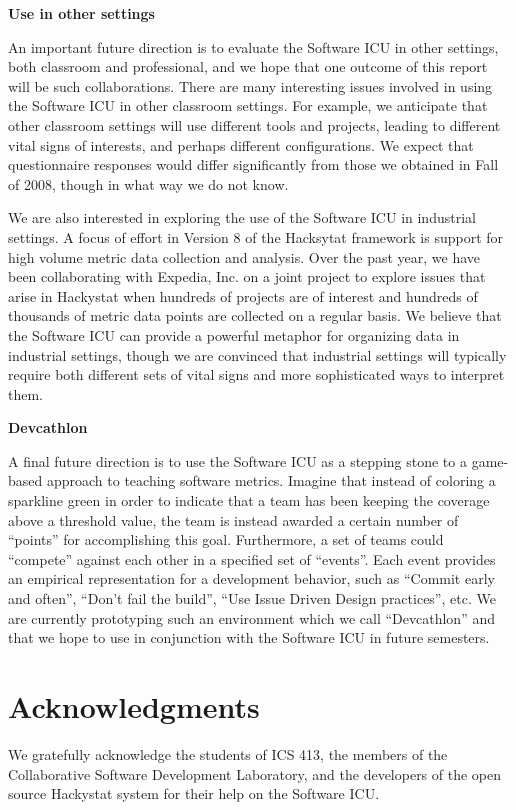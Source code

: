 \documentclass{acm_proc_article-sp}
\begin{document}
{\bf Use in other settings}

An important future direction is to evaluate the Software ICU in other
settings, both classroom and professional, and we hope that one outcome of
this report will be such collaborations.  There are many interesting issues
involved in using the Software ICU in other classroom settings. For
example, we anticipate that other classroom settings will use different
tools and projects, leading to different vital signs of interests, and
perhaps different configurations.  We expect that questionnaire
responses would differ significantly from those we obtained in Fall of
2008, though in what way we do not know.

We are also interested in exploring the use of the Software ICU in
industrial settings.  A focus of effort in Version 8 of the Hacksytat
framework is support for high volume metric data collection and
analysis.  Over the past year, we have been collaborating with Expedia,
Inc. on a joint project to explore issues that arise in Hackystat when
hundreds of projects are of interest and hundreds of thousands of metric
data points are collected on a regular basis.  We believe that the Software
ICU can provide a powerful metaphor for organizing data in industrial
settings, though we are convinced that industrial settings will typically
require both different sets of vital signs and more sophisticated ways to
interpret them.

{\bf Devcathlon}

A final future direction is to use the Software ICU as a stepping stone to
a game-based approach to teaching software metrics.  Imagine that instead
of coloring a sparkline green in order to indicate that a team has been
keeping the coverage above a threshold value, the team is instead awarded
a certain number of ``points'' for accomplishing this goal.  Furthermore,
a set of teams could ``compete'' against each other in a specified set of
``events''.  Each event provides an empirical representation for a
development behavior, such as ``Commit early and often'', ``Don't fail the
build'', ``Use Issue Driven Design practices'', etc.  We are currently
prototyping such an environment which we call ``Devcathlon'' and that we
hope to use in conjunction with the Software ICU in future semesters.

\section{Acknowledgments}

We gratefully acknowledge the students of ICS 413, the members of the Collaborative Software Development Laboratory, and
the developers of the open source Hackystat system for their help on the Software ICU.


  
\end{document}
